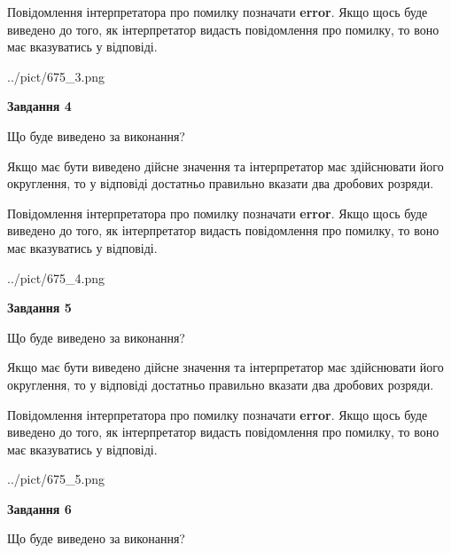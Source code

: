 \documentclass[12pt, ukrainian]{article}
\begin{document}
{\begin {Large}
Повідомлення інтерпретатора про помилку позначати \textbf{error}.
Якщо щось буде виведено до того, як інтерпретатор видасть повідомлення про помилку, 
то воно має вказуватись у відповіді. \par

\begin{center}
	{../pict/675_3.png}
\end{center}
\newpage

{\begin {center}\textbf{Завдання 4}\end {center}}\par
Що буде виведено за виконання? \par

Якщо має бути виведено дійсне значення та інтерпретатор має здійснювати його округлення, 
то у відповіді достатньо правильно вказати два дробових розряди.

Повідомлення інтерпретатора про помилку позначати \textbf{error}.
Якщо щось буде виведено до того, як інтерпретатор видасть повідомлення про помилку, 
то воно має вказуватись у відповіді. \par

\begin{center}
	{../pict/675_4.png}
\end{center}
\newpage

{\begin {center}\textbf{Завдання 5}\end {center}}\par
Що буде виведено за виконання? \par

Якщо має бути виведено дійсне значення та інтерпретатор має здійснювати його округлення, 
то у відповіді достатньо правильно вказати два дробових розряди.

Повідомлення інтерпретатора про помилку позначати \textbf{error}.
Якщо щось буде виведено до того, як інтерпретатор видасть повідомлення про помилку, 
то воно має вказуватись у відповіді. \par

\begin{center}
	{../pict/675_5.png}
\end{center}
\newpage

{\begin {center}\textbf{Завдання 6}\end {center}}\par
Що буде виведено за виконання? \par


\end{Large}}
\end{document}
